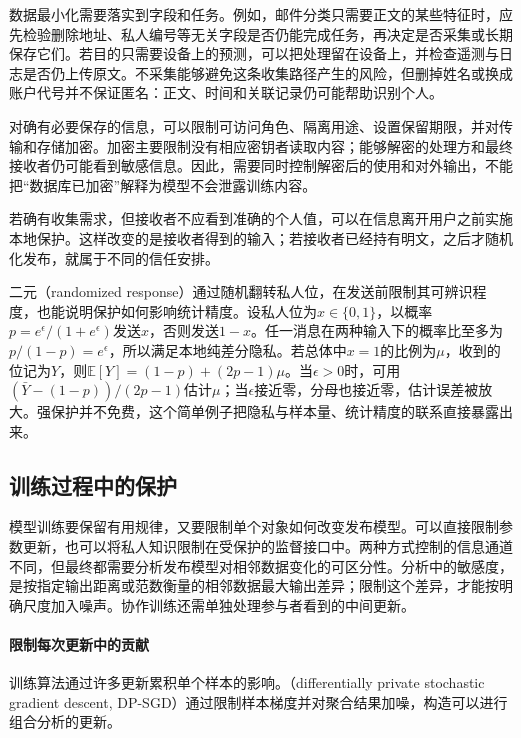 数据最小化需要落实到字段和任务。例如，邮件分类只需要正文的某些特征时，应先检验删除地址、私人编号等无关字段是否仍能完成任务，再决定是否采集或长期保存它们。若目的只需要设备上的预测，可以把处理留在设备上，并检查遥测与日志是否仍上传原文。不采集能够避免这条收集路径产生的风险，但删掉姓名或换成账户代号并不保证匿名：正文、时间和关联记录仍可能帮助识别个人。

对确有必要保存的信息，可以限制可访问角色、隔离用途、设置保留期限，并对传输和存储加密。加密主要限制没有相应密钥者读取内容；能够解密的处理方和最终接收者仍可能看到敏感信息。因此，需要同时控制解密后的使用和对外输出，不能把“数据库已加密”解释为模型不会泄露训练内容。

若确有收集需求，但接收者不应看到准确的个人值，可以在信息离开用户之前实施本地保护。这样改变的是接收者得到的输入；若接收者已经持有明文，之后才随机化发布，就属于不同的信任安排。

二元（randomized response）通过随机翻转私人位，在发送前限制其可辨识程度，也能说明保护如何影响统计精度。设私人位为$x\in\{0,1\}$，以概率$p=e^\epsilon/(1+e^\epsilon)$发送$x$，否则发送$1-x$。任一消息在两种输入下的概率比至多为$p/(1-p)=e^\epsilon$，所以满足本地纯差分隐私。若总体中$x=1$的比例为$\mu$，收到的位记为$Y$，则$\mathbb E[Y]=(1-p)+(2p-1)\mu$。当$\epsilon>0$时，可用$(\bar Y-(1-p))/(2p-1)$估计$\mu$；当$\epsilon$接近零，分母也接近零，估计误差被放大。强保护并不免费，这个简单例子把隐私与样本量、统计精度的联系直接暴露出来。

\subsection{训练过程中的保护}
\label{sec:privacy-training-influence}

模型训练要保留有用规律，又要限制单个对象如何改变发布模型。可以直接限制参数更新，也可以将私人知识限制在受保护的监督接口中。两种方式控制的信息通道不同，但最终都需要分析发布模型对相邻数据变化的可区分性。分析中的敏感度，是按指定输出距离或范数衡量的相邻数据最大输出差异；限制这个差异，才能按明确尺度加入噪声。协作训练还需单独处理参与者看到的中间更新。

\paragraph{限制每次更新中的贡献}

训练算法通过许多更新累积单个样本的影响。（differentially private stochastic gradient descent, DP-SGD）通过限制样本梯度并对聚合结果加噪，构造可以进行组合分析的更新。

